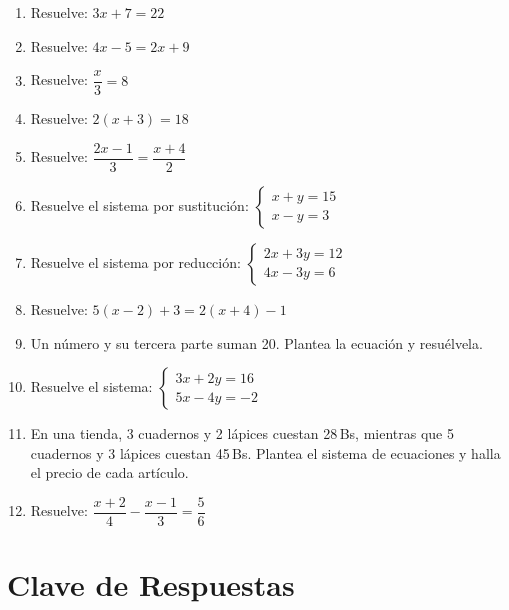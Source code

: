 \documentclass[12pt, letterpaper]{article}
\begin{document}
\begin{enumerate}[leftmargin=*, resume]
  \item \facil{} Resuelve: $3x + 7 = 22$

  \item \facil{} Resuelve: $4x - 5 = 2x + 9$

  \item \facil{} Resuelve: $\dfrac{x}{3} = 8$

  \item \facil{} Resuelve: $2(x + 3) = 18$

  \item \medio{} Resuelve: $\dfrac{2x - 1}{3} = \dfrac{x + 4}{2}$

  \item \medio{} Resuelve el sistema por sustitución:
        $\begin{cases} x + y = 15 \\ x - y = 3 \end{cases}$

  \item \medio{} Resuelve el sistema por reducción:
        $\begin{cases} 2x + 3y = 12 \\ 4x - 3y = 6 \end{cases}$

  \item \medio{} Resuelve: $5(x - 2) + 3 = 2(x + 4) - 1$

  \item \dificil{} Un número y su tercera parte suman 20. Plantea la ecuación y resuélvela.

  \item \dificil{} Resuelve el sistema:
        $\begin{cases} 3x + 2y = 16 \\ 5x - 4y = -2 \end{cases}$

  \item \dificil{} En una tienda, 3 cuadernos y 2 lápices cuestan 28\,Bs, mientras que 5 cuadernos y 3 lápices cuestan 45\,Bs. Plantea el sistema de ecuaciones y halla el precio de cada artículo.

  \item \dificil{} Resuelve: $\dfrac{x + 2}{4} - \dfrac{x - 1}{3} = \dfrac{5}{6}$
\end{enumerate}

\newpage

\ifmwclaves
  \section{Clave de Respuestas}
\end{document}
